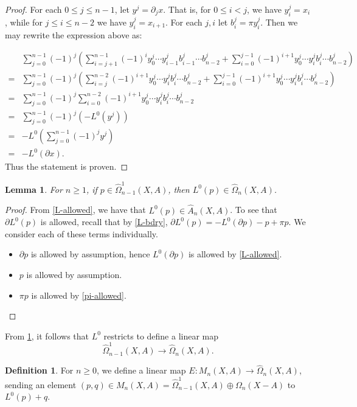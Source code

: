 \documentclass[11pt]{article}
\newtheorem{lemma}[theo]{Lemma}
\theoremstyle{definition}
\newtheorem{defi}[theo]{Definition}
\numberwithin{equation}{section}
\newcommand{\tOmega}{\widehat{\Omega}}
\newcommand{\tA}{\widehat{A}}
\newcommand{\tOmegaOne}{\widehat{\Omega}^1}
\newcommand{\bd}{\partial}
\begin{document}
\begin{proof}
For each $0 \leq j \leq n - 1$, let $y^j = \bd_j x$. That is, for $0 \leq i < j$, we have $y^j_i = x_i$, while for $j \leq i \leq n - 2$ we have $y^j_i = x_{i+1}$. For each $j, i$ let $b^j_i = \pi y^j_i$. Then we may rewrite the expression above as:

\begin{align*}
& \sum_{j = 0}^{n-1} (-1)^j (\sum_{i=j+1}^{n-1} (-1)^{i} y^j_0 \cdots y^j_{i-1} b^j_{i-1} \cdots b^j_{n-2} + \sum_{i = 0}^{j-1} (-1)^{i+1} y^j_0 \cdots y^j_i b^j_i  \cdots b^j_{n-2}) \\
= & \sum_{j = 0}^{n-1} (-1)^j (\sum_{i=j}^{n-2} (-1)^{i+1} y^j_0 \cdots y^j_{i} b^j_{i} \cdots b^j_{n-2} +  \sum_{i = 0}^{j-1} (-1)^{i+1} y^j_0 \cdots y^j_i b^j_i  \cdots b^j_{n-2}) \\
= & \sum_{j = 0}^{n-1} (-1)^j \sum_{i = 0}^{n-2} (-1)^{i+1} y^j_0 \cdots y^j_i b^j_i \cdots b^j_{n-2} \\
= & \sum_{j = 0}^{n-1} (-1)^j (-L^0(y^j)) \\
= & -L^0(\sum_{j = 0}^{n-1} (-1)^j y^j) \\
= & -L^0(\bd x).
\end{align*}
Thus the statement is proven.
\end{proof}

\begin{lemma}\label{L-Omega-to-Omega}
For $n \geq 1$, if $p \in \tOmegaOne_{n-1}(X,A)$, then $L^0(p) \in \tOmega_{n}(X,A)$.
\end{lemma}

\begin{proof}
From \cref{L-allowed}, we have that $L^0(p) \in \tA_n(X,A)$. To see that $\bd L^0(p)$ is allowed, recall that by \cref{L-bdry}, $\bd L^0(p) = -L^0(\bd p) - p + \pi p$. We consider each of these terms individually.

\begin{itemize}
    \item $\bd p$ is allowed by assumption, hence $L^0(\bd p)$ is allowed by \cref{L-allowed}.
    \item $p$ is allowed by assumption.
    \item $\pi p$ is allowed by \cref{pi-allowed}. \qedhere
\end{itemize}
\end{proof}

From \cref{L-Omega-to-Omega}, it follows that $L^0$ restricts to define a linear map \[\tOmegaOne_{n-1}(X,A) \to \tOmega_n(X,A).\]

\begin{defi}\label{iso-def}
For $n \geq 0$, we define a linear map $E \colon M_n(X,A) \to \tOmega_n(X,A)$, sending an element $(p,q) \in M_n(X,A) = \tOmegaOne_{n-1}(X,A) \oplus \Omega_{n}(X-A)$ to $L^0(p) + q$.
\end{defi}
\end{document}
